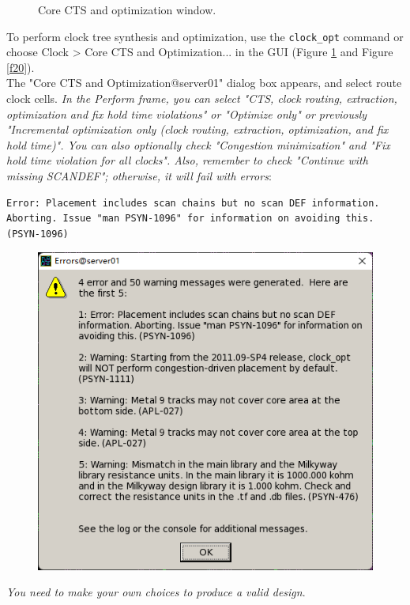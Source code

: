 \documentclass[a4paper,12pt,twoside]{article}
\begin{document}
\begin{enumerate}
\begin{enumerate}
\begin{figure}[H]
            \caption{Core CTS and optimization window.}
            \label{f18}
        \end{figure}
        To perform clock tree synthesis and optimization, use the \texttt{clock\_opt} command or choose Clock > Core CTS and Optimization... in the GUI (Figure \ref{f18} and Figure \ref{f20}).\\
        The "Core CTS and Optimization@server01" dialog box appears, and select route clock cells. \textit{In the Perform frame, you can select "CTS, clock routing, extraction, optimization and fix hold time violations" or "Optimize only" or previously "Incremental optimization only (clock routing, extraction, optimization, and fix hold time)". You can also optionally check "Congestion minimization" and "Fix hold time violation for all clocks". Also, remember to check "Continue with missing SCANDEF"; otherwise, it will fail with errors}:
        \begin{verbatim}
Error: Placement includes scan chains but no scan DEF information. Aborting. Issue "man PSYN-1096" for information on avoiding this. (PSYN-1096)
        \end{verbatim}
        \begin{figure}[H]
            \centering
            \includegraphics[width=\textwidth]{images/19.png}
        \end{figure}
        \textit{You need to make your own choices to produce a valid design}.

\end{enumerate}
\end{enumerate}
\end{document}
